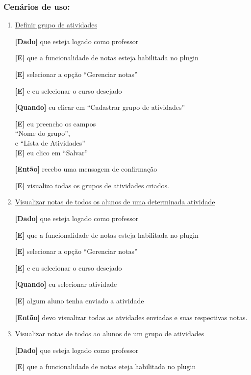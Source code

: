 \begin{enumerate}
\subsubsection*{Cenários de uso:}

\begin{enumerate}

\item \underline{Definir grupo de atividades}

\textbf{[Dado]} que esteja logado como professor

\textbf{[E]} que a funcionalidade de notas esteja habilitada no plugin

\textbf{[E]} selecionar a opção ``Gerenciar notas''

\textbf{[E]} e eu selecionar o curso desejado

\textbf{[Quando]} eu clicar em ``Cadastrar grupo de atividades''

\textbf{[E]} eu preencho os campos \\
``Nome do grupo'',\\
e ``Lista de Atividades''\\
\textbf{[E]} eu clico em ``Salvar''

\textbf{[Então]} recebo uma mensagem de confirmação

\textbf{[E]} visualizo todas os grupos de atividades criados.

\item \underline{Visualizar notas de todos os alunos de uma determinada atividade}

\textbf{[Dado]} que esteja logado como professor

\textbf{[E]} que a funcionalidade de notas esteja habilitada no plugin

\textbf{[E]} selecionar a opção ``Gerenciar notas''

\textbf{[E]} e eu selecionar o curso desejado

\textbf{[Quando]} eu selecionar atividade

\textbf{[E]} algum aluno tenha enviado a atividade

\textbf{[Então]} devo visualizar todas as atvidades enviadas e suas respectivas notas.

\item \underline{Visualizar notas de todos ao alunos de um grupo de atividades}

\textbf{[Dado]} que esteja logado como professor

\textbf{[E]} que a funcionalidade de notas eteja habilitada no plugin


\end{enumerate}
\end{enumerate}
